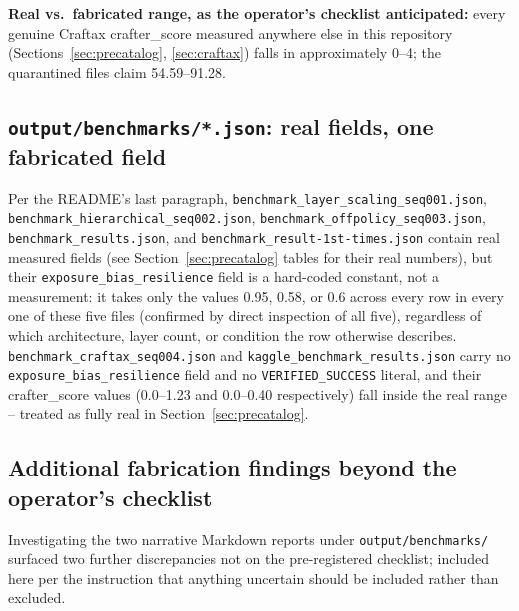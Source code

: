 \documentclass[11pt]{article}
\newcommand{\srcpath}[1]{\texttt{\small #1}}
\begin{document}
\textbf{Real vs.\ fabricated range, as the operator's checklist anticipated:} every genuine Craftax
crafter\_score measured anywhere else in this repository (Sections~\ref{sec:precatalog},
\ref{sec:craftax}) falls in approximately 0--4; the quarantined files claim 54.59--91.28.

\subsection{\texttt{output/benchmarks/*.json}: real fields, one fabricated field}

Per the README's last paragraph, \srcpath{benchmark\_layer\_scaling\_seq001.json},
\srcpath{benchmark\_hierarchical\_seq002.json}, \srcpath{benchmark\_offpolicy\_seq003.json},
\srcpath{benchmark\_results.json}, and \srcpath{benchmark\_result-1st-times.json} contain real
measured fields (see Section~\ref{sec:precatalog} tables for their real numbers), but their
\texttt{exposure\_bias\_resilience} field is a hard-coded constant, not a measurement: it takes
only the values 0.95, 0.58, or 0.6 across every row in every one of these five files (confirmed by
direct inspection of all five), regardless of which architecture, layer count, or condition the row
otherwise describes. \srcpath{benchmark\_craftax\_seq004.json} and
\srcpath{kaggle\_benchmark\_results.json} carry no \texttt{exposure\_bias\_resilience} field and no
\texttt{VERIFIED\_SUCCESS} literal, and their crafter\_score values (0.0--1.23 and 0.0--0.40
respectively) fall inside the real range -- treated as fully real in Section~\ref{sec:precatalog}.

\subsection{Additional fabrication findings beyond the operator's checklist}

Investigating the two narrative Markdown reports under \srcpath{output/benchmarks/} surfaced two
further discrepancies not on the pre-registered checklist; included here per the instruction that
anything uncertain should be included rather than excluded.
\end{document}

